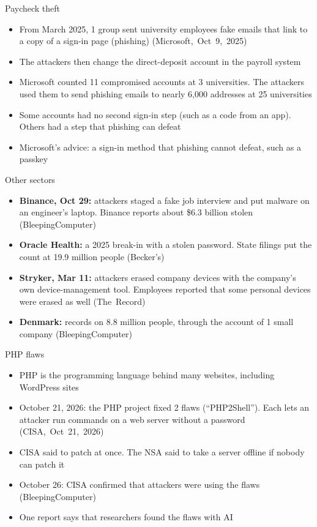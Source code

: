 \documentclass[11pt]{beamer}
\newcommand{\srccite}[1]{{\scriptsize\textcolor{citecol}{#1}}}
\newcommand{\vfy}{\unskip}
\newcommand{\vfy}{\unskip\nobreakspace{\scriptsize\textcolor{citecol}{[verify]}}}
\renewcommand{\srccite}[1]{{\scriptsize\textcolor{citecol}{\mbox{#1}}}}
\begin{document}
\begin{frame}{Paycheck theft}
\pause
\begin{itemize}\setlength\itemsep{8pt}
\item From March 2025, 1 group sent university employees fake emails that link to a copy of a sign-in page (phishing) \srccite{(Microsoft, Oct 9, 2025)} \pause
\item The attackers then change the direct-deposit account in the payroll system \pause
\item Microsoft counted 11 compromised accounts at 3 universities. The attackers used them to send phishing emails to nearly 6,000 addresses at 25 universities \pause
\item Some accounts had no second sign-in step (such as a code from an app). Others had a step that phishing can defeat \pause
\item[$\rightarrow$] Microsoft's advice: a sign-in method that phishing cannot defeat, such as a passkey
\end{itemize}
\end{frame}


\begin{frame}{Other sectors}
\pause
\begin{itemize}\setlength\itemsep{8pt}
\item \textbf{Binance, Oct 29:} attackers staged a fake job interview and put malware on an engineer's laptop. Binance reports about \$6.3 billion stolen \srccite{(BleepingComputer)} \vfy \pause
\item \textbf{Oracle Health:} a 2025 break-in with a stolen password. State filings put the count at 19.9 million people \srccite{(Becker's)} \vfy \pause
\item \textbf{Stryker, Mar 11:} attackers erased company devices with the company's own device-management tool. Employees reported that some personal devices were erased as well \srccite{(The Record)} \vfy \pause
\item \textbf{Denmark:} records on 8.8 million people, through the account of 1 small company \srccite{(BleepingComputer)} \vfy
\end{itemize}
\end{frame}


\begin{frame}{PHP flaws}
\pause
\begin{itemize}\setlength\itemsep{8pt}
\item PHP is the programming language behind many websites, including WordPress sites \pause
\item October 21, 2026: the PHP project fixed 2 flaws (``PHP2Shell''). Each lets an attacker run commands on a web server without a password \srccite{(CISA, Oct 21, 2026)} \vfy \pause
\item CISA said to patch at once. The NSA said to take a server offline if nobody can patch it \vfy \pause
\item October 26: CISA confirmed that attackers were using the flaws \srccite{(BleepingComputer)} \vfy \pause
\item One report says that researchers found the flaws with AI \vfy
\end{itemize}
\end{frame}
\end{document}
